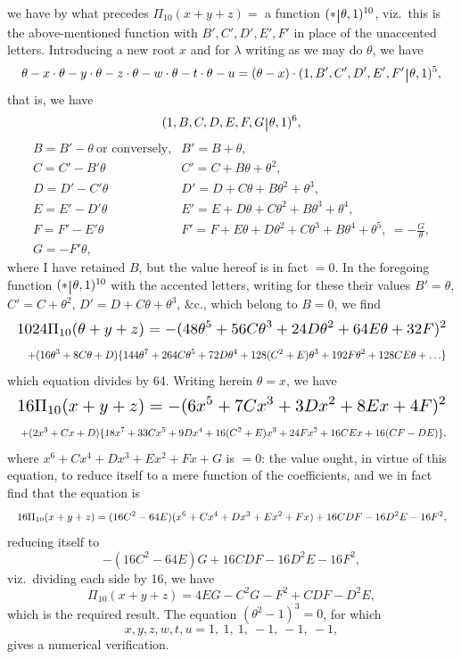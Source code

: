 \documentclass[11pt]{article}
\begin{document}
\clearpage
we have by what precedes $\Pi_{10}(x + y + z) = $ a function $(\ast\,\rule[-1ex]{0.6pt}{2.5ex}\,\theta, 1)^{10}$, viz.\ this is the above-mentioned function with $B', C', D', E', F'$ in place of the unaccented letters. Introducing a new root $x$ and for $\lambda$ writing as we may do $\theta$, we have
\[
\theta - x \cdot \theta - y \cdot \theta - z \cdot \theta - w \cdot \theta - t \cdot \theta - u = (\theta - x) \cdot (1, B', C', D', E', F'\,\rule[-1ex]{0.6pt}{2.5ex}\,\theta, 1)^5,
\]
that is, we have
\[
(1, B, C, D, E, F, G\,\rule[-1ex]{0.6pt}{2.5ex}\,\theta, 1)^6,
\]
\[
\begin{array}{ll}
B = B' - \theta\ \text{or conversely,} & B' = B + \theta, \\
C = C' - B'\theta & C' = C + B\theta + \theta^2, \\
D = D' - C'\theta & D' = D + C\theta + B\theta^2 + \theta^3, \\
E = E' - D'\theta & E' = E + D\theta + C\theta^2 + B\theta^3 + \theta^4, \\
F = F' - E'\theta & F' = F + E\theta + D\theta^2 + C\theta^3 + B\theta^4 + \theta^5,\ = -\frac{G}{\theta}, \\
G = -F'\theta, &
\end{array}
\]
where I have retained $B$, but the value hereof is in fact $= 0$. In the foregoing function $(\ast\,\rule[-1ex]{0.6pt}{2.5ex}\,\theta, 1)^{10}$ with the accented letters, writing for these their values $B' = \theta$, $C' = C + \theta^2$, $D' = D + C\theta + \theta^3$, \&c., which belong to $B = 0$, we find
\[
\resizebox{\textwidth}{!}{$\displaystyle
1024\Pi_{10}(\theta + y + z) = -(48\theta^5 + 56C\theta^3 + 24D\theta^2 + 64E\theta + 32F)^2
$}
\]
\[
\resizebox{\textwidth}{!}{$\displaystyle
\quad + (16\theta^3 + 8C\theta + D)\{144\theta^7 + 264C\theta^5 + 72D\theta^4 + 128(C^2 + E)\theta^3 + 192F\theta^2 + 128CE\theta + \ldots\}
$}
\]
which equation divides by 64. Writing herein $\theta = x$, we have
\[
\resizebox{\textwidth}{!}{$\displaystyle
16\Pi_{10}(x + y + z) = -(6x^5 + 7Cx^3 + 3Dx^2 + 8Ex + 4F)^2
$}
\]
\[
\resizebox{\textwidth}{!}{$\displaystyle
\ + (2x^3 + Cx + D)\{18x^7 + 33Cx^5 + 9Dx^4 + 16(C^2 + E)x^3 + 24Fx^2 + 16CEx + 16(CF - DE)\},
$}
\]
where $x^6 + Cx^4 + Dx^3 + Ex^2 + Fx + G$ is $= 0$: the value ought, in virtue of this equation, to reduce itself to a mere function of the coefficients, and we in fact find that the equation is
\[
\resizebox{\textwidth}{!}{$\displaystyle
16\Pi_{10}(x + y + z) = (16C^2 - 64E)(x^6 + Cx^4 + Dx^3 + Ex^2 + Fx) + 16CDF - 16D^2E - 16F^2,
$}
\]
reducing itself to
\[
- (16C^2 - 64E)G + 16CDF - 16D^2E - 16F^2,
\]
viz.\ dividing each side by 16, we have
\[
\Pi_{10}(x + y + z) = 4EG - C^2G - F^2 + CDF - D^2E,
\]
which is the required result. The equation $(\theta^2 - 1)^3 = 0$, for which
\[
x, y, z, w, t, u = 1,\ 1,\ 1,\ -1,\ -1,\ -1,
\]
gives a numerical verification.
\end{document}
